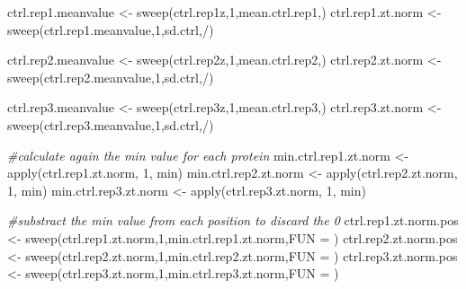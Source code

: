 \documentclass[
]{article}
\newenvironment{Shaded}{\begin{snugshade}}{\end{snugshade}}
\newcommand{\AttributeTok}[1]{\textcolor[rgb]{0.77,0.63,0.00}{#1}}
\newcommand{\CommentTok}[1]{\textcolor[rgb]{0.56,0.35,0.01}{\textit{#1}}}
\newcommand{\DecValTok}[1]{\textcolor[rgb]{0.00,0.00,0.81}{#1}}
\newcommand{\FunctionTok}[1]{\textcolor[rgb]{0.00,0.00,0.00}{#1}}
\newcommand{\NormalTok}[1]{#1}
\newcommand{\OtherTok}[1]{\textcolor[rgb]{0.56,0.35,0.01}{#1}}
\newcommand{\StringTok}[1]{\textcolor[rgb]{0.31,0.60,0.02}{#1}}
\begin{document}
\begin{Shaded}
\begin{Highlighting}[]
\NormalTok{ctrl.rep1.meanvalue }\OtherTok{\textless{}{-}} \FunctionTok{sweep}\NormalTok{(ctrl.rep1z,}\DecValTok{1}\NormalTok{,mean.ctrl.rep1,}\StringTok{\textquotesingle{}{-}\textquotesingle{}}\NormalTok{)}
\NormalTok{ctrl.rep1.zt.norm }\OtherTok{\textless{}{-}} \FunctionTok{sweep}\NormalTok{(ctrl.rep1.meanvalue,}\DecValTok{1}\NormalTok{,sd.ctrl,}\StringTok{\textquotesingle{}/\textquotesingle{}}\NormalTok{)}

\NormalTok{ctrl.rep2.meanvalue }\OtherTok{\textless{}{-}} \FunctionTok{sweep}\NormalTok{(ctrl.rep2z,}\DecValTok{1}\NormalTok{,mean.ctrl.rep2,}\StringTok{\textquotesingle{}{-}\textquotesingle{}}\NormalTok{)}
\NormalTok{ctrl.rep2.zt.norm }\OtherTok{\textless{}{-}} \FunctionTok{sweep}\NormalTok{(ctrl.rep2.meanvalue,}\DecValTok{1}\NormalTok{,sd.ctrl,}\StringTok{\textquotesingle{}/\textquotesingle{}}\NormalTok{)}

\NormalTok{ctrl.rep3.meanvalue }\OtherTok{\textless{}{-}} \FunctionTok{sweep}\NormalTok{(ctrl.rep3z,}\DecValTok{1}\NormalTok{,mean.ctrl.rep3,}\StringTok{\textquotesingle{}{-}\textquotesingle{}}\NormalTok{)}
\NormalTok{ctrl.rep3.zt.norm }\OtherTok{\textless{}{-}} \FunctionTok{sweep}\NormalTok{(ctrl.rep3.meanvalue,}\DecValTok{1}\NormalTok{,sd.ctrl,}\StringTok{\textquotesingle{}/\textquotesingle{}}\NormalTok{)}

\CommentTok{\#calculate again the min value for each protein}
\NormalTok{min.ctrl.rep1.zt.norm }\OtherTok{\textless{}{-}} \FunctionTok{apply}\NormalTok{(ctrl.rep1.zt.norm, }\DecValTok{1}\NormalTok{, min)}
\NormalTok{min.ctrl.rep2.zt.norm }\OtherTok{\textless{}{-}} \FunctionTok{apply}\NormalTok{(ctrl.rep2.zt.norm, }\DecValTok{1}\NormalTok{, min)}
\NormalTok{min.ctrl.rep3.zt.norm }\OtherTok{\textless{}{-}} \FunctionTok{apply}\NormalTok{(ctrl.rep3.zt.norm, }\DecValTok{1}\NormalTok{, min)}

\CommentTok{\#substract the min value from each position to discard the 0}
\NormalTok{ctrl.rep1.zt.norm.pos }\OtherTok{\textless{}{-}} \FunctionTok{sweep}\NormalTok{(ctrl.rep1.zt.norm,}\DecValTok{1}\NormalTok{,min.ctrl.rep1.zt.norm,}\AttributeTok{FUN =} \StringTok{\textquotesingle{}{-}\textquotesingle{}}\NormalTok{)}
\NormalTok{ctrl.rep2.zt.norm.pos }\OtherTok{\textless{}{-}} \FunctionTok{sweep}\NormalTok{(ctrl.rep2.zt.norm,}\DecValTok{1}\NormalTok{,min.ctrl.rep2.zt.norm,}\AttributeTok{FUN =} \StringTok{\textquotesingle{}{-}\textquotesingle{}}\NormalTok{)}
\NormalTok{ctrl.rep3.zt.norm.pos }\OtherTok{\textless{}{-}} \FunctionTok{sweep}\NormalTok{(ctrl.rep3.zt.norm,}\DecValTok{1}\NormalTok{,min.ctrl.rep3.zt.norm,}\AttributeTok{FUN =} \StringTok{\textquotesingle{}{-}\textquotesingle{}}\NormalTok{)}
\end{Highlighting}
\end{Shaded}
\end{document}
